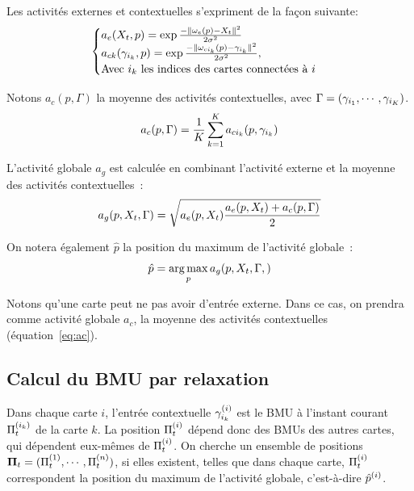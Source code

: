 \documentclass[../main]{subfiles}
\begin{document}
Les activités externes et contextuelles s'expriment de la façon suivante:
\begin{equation}
\label{eq:activite_general}
\begin{cases}
a_e(X_t,p) = \exp\frac{-\lVert \omega_e(p)-X_t \rVert^2}{2\sigma^2} \\
a_{ck}(\gamma_{i_k},p) = \exp\frac{-\lVert \omega_{ci_k}(p)-\gamma_{i_k} \rVert ^2}{2\sigma^2}, \\
\text{Avec $i_k$ les indices des cartes connectées à $i$}
\end{cases}
\end{equation}

Notons $a_c(p, \Gamma)$ la moyenne des activités contextuelles, avec $\Gamma = (\gamma_{i_1}, \cdots, \gamma_{i_K})$.
\begin{equation}\label{eq:ac}
a_c(p, \Gamma) = \frac{1}{K}\sum_{k=1}^K {a_{ci_k}(p,\gamma_{i_k})}
\end{equation}

L'activité globale $a_g$ est calculée en combinant l'activité externe et la moyenne des activités contextuelles~:
\begin{equation}
\label{eq:global_act}
a_g(p, X_t,\Gamma) = \sqrt{a_e(p, X_t) \frac{a_e(p, X_t) +  a_c(p, \Gamma)}{2}}
\end{equation}

On notera également $\hat{p}$ la position du maximum de l'activité globale~:
\begin{equation}
\label{argmax}
\hat{p} = \operatorname*{arg\,max}_p a_g(p, X_t, \Gamma,)
\end{equation}

Notons qu'une carte peut ne pas avoir d'entrée externe. Dans ce cas, on prendra comme activité globale $a_c$, la moyenne des activités contextuelles (équation~\ref{eq:ac}).

\subsection{Calcul du BMU par relaxation}\label{sec:relax}

Dans chaque carte $i$, l'entrée contextuelle $\gamma^{({i})}_{i_k}$ est le BMU à l'instant courant $\Pi^{({i_k})}_t$  de la carte $k$. La position $\Pi^{({i})}_t$ dépend donc des BMUs des autres cartes, qui dépendent eux-mêmes de $\Pi^{({i})}_t$. On cherche un ensemble de positions $\mathbf{\Pi}_t = (\Pi^{({1})}_t, \cdots, \Pi^{({n})}_t)$, si elles existent, telles que dans chaque carte, $\Pi^{({i})}_t$ correspondent la position du maximum de l'activité globale, c'est-à-dire $\hat{p}^{({i})}$.
\end{document}
